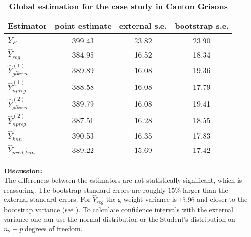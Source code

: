\documentclass[a4paper,12pt,leqno, titlepage]{article}
\begin{document}
 \begin{table}[ht]
\centering
\caption{ \label{casestudy1}\textbf{Global estimation for the case study in Canton Grisons}}\\[0.5cm]
\small
 \begin{tabular}{lccc}\hline
  Estimator & point estimate & external s.e.   & bootstrap s.e.\\ \hline\hline
 $\bar{Y}_F$               & 399.43  & 23.82    & 23.90    \\ \hline
 $\hat{Y}_{reg}$           & 384.95  & 16.52    & 18.34  \\ \hline\hline
 $\hat{Y}^{(1)}_{glkern}$  & 389.89  & 16.08    & 19.36      \\ \hline
 $\hat{Y}^{(1)}_{npreg}$   & 388.58  & 16.08    & 17.79    \\ \hline \hline
 $\hat{Y}^{(2)}_{glkern}$  & 389.79  & 16.08    & 19.41 \\ \hline
 $\hat{Y}^{(2)}_{npreg}$   & 387.51  & 16.28    & 18.55    \\ \hline \hline
 $\hat{Y}_{knn}$           & 390.53  & 16.35    & 17.83 \\ \hline
 $\hat{Y}_{pred,knn}$      & 389.22  & 15.69    & 17.42 \\ \hline\hline
 \end{tabular}
 \end{table}
 \normalsize
\noindent\textbf{Discussion:}\\[0.5cm]
The differences between the estimators are not statistically significant, which is reassuring. The bootstrap standard errors are roughly $15\%$ larger than the external standard errors. For $\hat{Y}_{reg}$ the g-weight variance is $16.96$ and closer to the bootstrap variance (see \cite{mandallaz4}). To calculate confidence intervals with the external variance one can use the normal distribution or the Student's distribution on $n_2-p$ degrees of freedom. \\[1cm]
\end{document}
